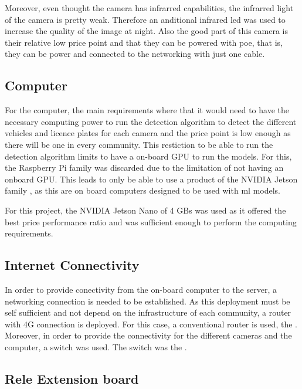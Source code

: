Moreover, even thought the camera has infrarred capabilities, the infrarred light of the camera is pretty weak. Therefore an anditional infrared led was used to increase the quality of the image at night. Also the good part of this camera is their relative low price point and that they can be powered with \gls{poe}, that is, they can be power and connected to the networking with just one cable.


\subsection{Computer}

For the computer, the main requirements where that it would need to have the necessary computing power to run the detection algorithm to detect the different vehicles and licence plates for each camera and the price point is low enough as there will be one in every community. This restiction to be able to run the detection algorithm limits to have a on-board GPU to run the models. For this, the Raspberry Pi family \autocite{raspberrypi} was discarded due to the limitation of not having an onboard GPU. This leads to only be able to use a product of the NVIDIA Jetson family \autocite{nvidiaJetsonModules}, as this are on board computers designed to be used with \gls{ml} models.

For this project, the NVIDIA Jetson Nano of 4 GBs was used as it offered the best price performance ratio and was sufficient enough to perform the computing requirements.

\subsection{Internet Connectivity}

In order to provide conectivity from the on-board computer to the server, a networking connection is needed to be established. As this deployment must be self sufficient and not depend on the infrastructure of each community, a router with 4G connection is deployed. For this case, a conventional router is used, the . Moreover, in order to provide the connectivity for the different cameras and the computer, a switch was used. The switch was the .


\subsection{Rele Extension board}


